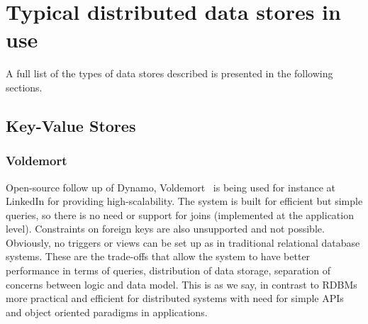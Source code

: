 		
	
		



\section{Typical distributed data stores in use} %
A full list of the types of data stores described is presented in the following sections.

\subsection{Key-Value Stores}

	\subsubsection{Voldemort}	
	Open-source follow up of Dynamo, Voldemort~\cite{Sumbaly:2012} is being used for instance at LinkedIn for providing high-scalability. The system is built for efficient but simple queries, so there is no need or support for joins (implemented at the application level). Constraints on foreign keys are also unsupported and not possible. Obviously, no triggers or views can be set up as in traditional relational database systems. These are the trade-offs that allow the system to have better performance in terms of queries, distribution of data storage, separation of concerns between logic and data model. This is as we say, in contrast to RDBMs more practical and efficient for distributed systems with need for simple APIs and object oriented paradigms in applications.
	
